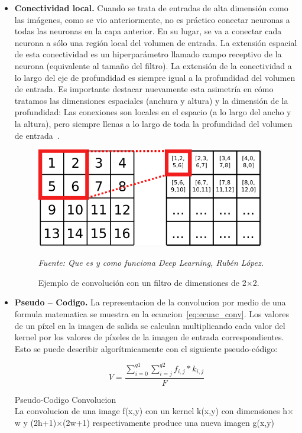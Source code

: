 \begin{itemize}
\item \textbf{Conectividad local.} Cuando se trata de entradas de alta dimensión como las imágenes, como se vio anteriormente, no es práctico conectar neuronas a todas las neuronas en la capa anterior. En su lugar, se va a conectar cada neurona a sólo una región local del volumen de entrada. La extensión espacial de esta
conectividad es un hiperparámetro llamado campo receptivo de la neurona (equivalente al tamaño del filtro). La extensión de la conectividad a lo largo del eje de profundidad es siempre igual a la profundidad del volumen de entrada. Es importante destacar nuevamente esta asimetría en cómo tratamos las dimensiones espaciales (anchura y altura) y la dimensión de la profundidad: Las conexiones son locales en el espacio (a lo largo del ancho y la altura), pero siempre llenas a lo largo de toda la profundidad del volumen de entrada~\cite{22RedesNeuronalesConvolu}.


\begin{figure}[H]
		\centering
		\includegraphics[width=100mm]{./Imagenes/convolucion.png}
		\caption{Ejemplo de convolución con un filtro de dimensiones de 2$\times$2.}
		\vspace{0.15cm}
		\textit{Fuente: Que es y como funciona Deep Learning, Rubén López.}
        	\label{fig:convolucion}
\end{figure}


\item { \textbf{Pseudo – Codigo.} La representacion de la convolucion por medio de una formula matematica se muestra en la ecuacion~\ref{eq:ecuac_conv}. Los valores de un píxel en la imagen de salida se calculan multiplicando cada valor del kernel por los valores de píxeles de la imagen de entrada correspondientes. Esto se puede describir algorítmicamente con el siguiente pseudo-código:

\begin{equation}\label{eq:ecuac_conv}
V = \frac{\sum^{q1}_{i=0}\sum^{q2}_{i=j} f_{i,j}*k_{i,j}}{F}
\end{equation}

\begin{algorithm}
\caption{Pseudo-Codigo Convolucion\\
La convolucion de una image f(x,y) con un kernel k(x,y) con dimensiones h$\times$w y (2h+1)$\times$(2w+1) respectivamente produce una nueva imagen g(x,y)}\label{alg:euclid}
\begin{algorithmic}[H]


\end{algorithmic}
\end{algorithm}}
\end{itemize}
